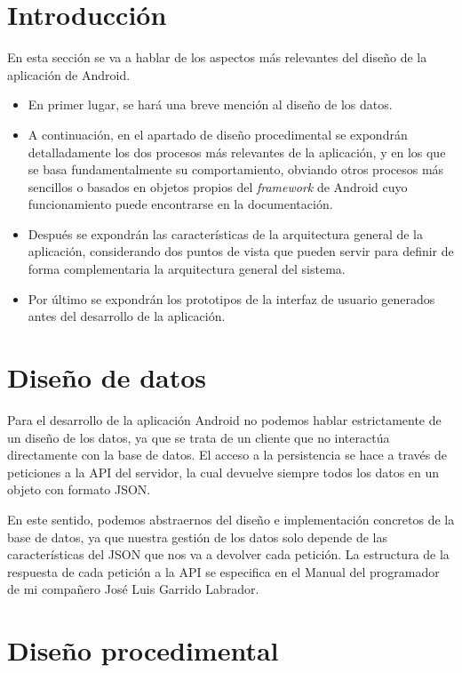 
\section{Introducción}
En esta sección se va a hablar de los aspectos más relevantes del diseño de la aplicación de Android.
\begin{itemize}
	\item En primer lugar, se hará una breve mención al diseño de los datos.
	\item A continuación, en el apartado de diseño procedimental se expondrán detalladamente los dos procesos más relevantes de la aplicación, y en los que se basa fundamentalmente su comportamiento, obviando otros procesos más sencillos o basados en objetos propios del \textit{framework} de Android cuyo funcionamiento puede encontrarse en la documentación.
	\item Después se expondrán las características de la arquitectura general de la aplicación, considerando dos puntos de vista que pueden servir para definir de forma complementaria la arquitectura general del sistema. 
	\item Por último se expondrán los prototipos de la interfaz de usuario generados antes del desarrollo de la aplicación. 
\end{itemize}

\section{Diseño de datos}

Para el desarrollo de la aplicación Android no podemos hablar estrictamente de un diseño de los datos, ya que se trata de un cliente que no interactúa directamente con la base de datos. El acceso a la persistencia se hace a través de peticiones a la API del servidor, la cual devuelve siempre todos los datos en un objeto con formato JSON. 

En este sentido, podemos abstraernos del diseño e implementación concretos de la base de datos, ya que nuestra gestión de los datos solo depende de las características del JSON que nos va a devolver cada petición. La estructura de la respuesta de cada petición a la API se especifica en el Manual del programador de mi compañero José Luis Garrido Labrador. 

\section{Diseño procedimental}

